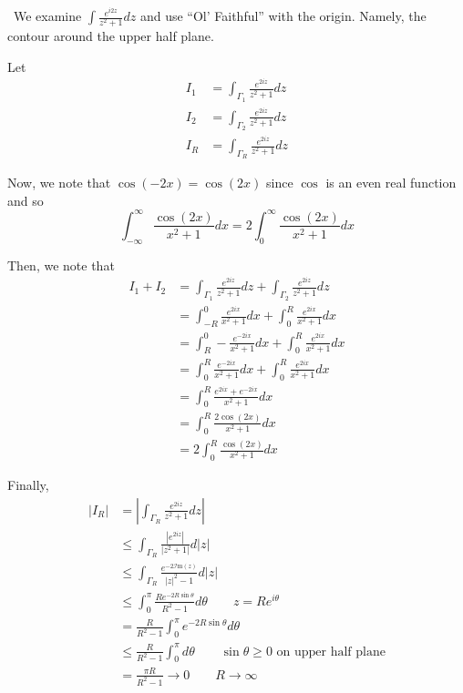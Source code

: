 \documentclass[12pt]{Homework}
\newcommand{\im}{\mathscr{I}\text{m}}
\begin{document}
\begin{solution}$\,$
We examine $\displaystyle\int\frac{e^{i2z}}{z^2+1}dz$ and use ``Ol' Faithful'' with the origin. Namely, the contour around the upper half plane.

\begin{center}
\end{center}

Let \begin{align*}
    I_1&=\int_{\Gamma_1}\frac{e^{2iz}}{z^2+1}dz\\
    I_2&=\int_{\Gamma_2}\frac{e^{2iz}}{z^2+1}dz\\
    I_R&=\int_{\Gamma_R}\frac{e^{2iz}}{z^2+1}dz
\end{align*}

Now, we note that $\cos(-2x)=\cos(2x)$ since $\cos$ is an even real function and so $$\int_{-\infty}^\infty\frac{\cos(2x)}{x^2+1}dx=2\int_0^\infty\frac{\cos(2x)}{x^2+1}dx$$

Then, we note that \begin{align*}
    I_1+I_2&=\int_{\Gamma_1}\frac{e^{2iz}}{z^2+1}dz+\int_{\Gamma_2}\frac{e^{2iz}}{z^2+1}dz\\
    &=\int_{-R}^0\frac{e^{2ix}}{x^2+1}dx+\int_0^R\frac{e^{2ix}}{x^2+1}dx\\
    &=\int_R^0-\frac{e^{-2ix}}{x^2+1}dx+\int_0^R\frac{e^{2ix}}{x^2+1}dx\\
    &=\int_0^R\frac{e^{-2ix}}{x^2+1}dx+\int_0^R\frac{e^{2ix}}{x^2+1}dx\\
    &=\int_0^R\frac{e^{2ix}+e^{-2ix}}{x^2+1}dx\\
    &=\int_0^R\frac{2\cos(2x)}{x^2+1}dx\\
    &=2\int_0^R\frac{\cos(2x)}{x^2+1}dx
\end{align*}

Finally, \begin{align*}
    |I_R|&=\left|\int_{\Gamma_R}\frac{e^{2iz}}{z^2+1}dz\right|\\
    &\le\int_{\Gamma_R}\frac{|e^{2iz}|}{|z^2+1|}d|z|\\
    &\le\int_{\Gamma_R}\frac{e^{-2\im(z)}}{|z|^2-1}d|z|\\
    &\le\int_0^\pi\frac{Re^{-2R\sin\theta}}{R^2-1}d\theta \qquad z=Re^{i\theta}\\
    &=\frac{R}{R^2-1}\int_0^\pi e^{-2R\sin\theta} d\theta\\
    &\le \frac{R}{R^2-1}\int_0^\pi d\theta\qquad \sin\theta\ge 0\text{ on upper half plane}\\
    &=\frac{\pi R}{R^2-1}\to0\qquad R\to\infty
\end{align*}


\end{solution}
\end{document}
